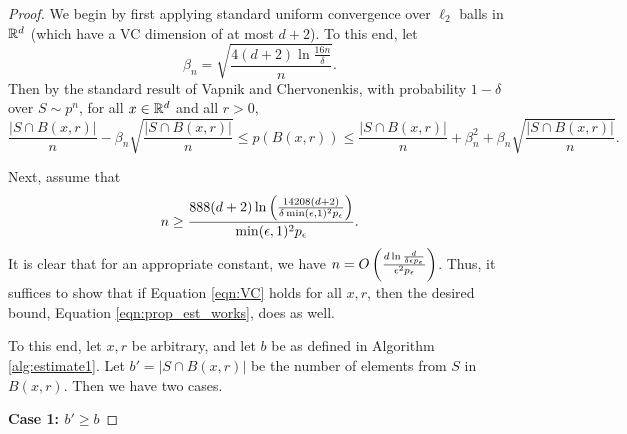 \begin{proof}
We begin by first applying standard uniform convergence over $\ell_2$ balls in $\mathbb{R}^d$ (which have a VC dimension of at most $d+2$). To this end, let $$\beta_n = \sqrt{\frac{4(d+2)\ln \frac{16n}{\delta}}{n}}.$$ Then by the standard result of Vapnik and Chervonenkis, with probability $1-\delta$ over $S \sim p^n$, for all $x \in \mathbb{R}^d$ and all $r > 0$, 
\begin{equation}\label{eqn:VC}
\frac{|S \cap B(x,r)|}{n} - \beta_n\sqrt{\frac{|S \cap B(x,r)|}{n}} \leq p(B(x,r)) \leq \frac{|S \cap B(x,r)|}{n} + \beta_n^2 + \beta_n\sqrt{\frac{|S \cap B(x,r)|}{n}}.
\end{equation}

Next, assume that 
\begin{equation}\label{eqn:bound_n}
n \geq \frac{888(d+2)\ln \left(\frac{14208(d+2)}{\delta \min(\epsilon,1)^2 p_\epsilon} \right)}{\min(\epsilon,1)^2 p_\epsilon}.
\end{equation} 
It is clear that for an appropriate constant, we have $n = O \left(\frac{d\ln\frac{d}{\delta\epsilon p_\epsilon}}{\epsilon^2 p_\epsilon} \right)$. Thus, it suffices to show that if Equation \ref{eqn:VC} holds for all $x, r$, then the desired bound,  Equation \ref{eqn:prop_est_works}, does as well. 

To this end, let $x, r$ be arbitrary, and let $b$ be as defined in Algorithm \ref{alg:estimate1}. Let $b' = |S \cap B(x, r)|$ be the number of elements from $S$ in $B(x, r)$. Then we have two cases.

\textbf{Case 1: $b' \geq b$}


\end{proof}
